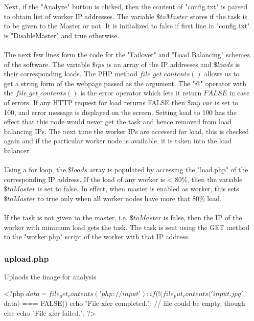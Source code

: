 \documentclass{article}
\begin{document}
Next, if the "Analyze" button is clicked, then the content of "config.txt" is parsed to obtain list of worker IP addresses. The variable $\$toMaster$ stores if the task is to be given to the Master or not. It is initialized to false if first line in "config.txt" is "DisableMaster" and true otherwise.\\ \\
The next few lines form the code for the "Failover" and "Load Balancing" schemes of the software. The variable $\$ips$ is an array of the IP addresses and $\$loads$ is their corresponding loads. The PHP method $file\_get\_contents()$ allows us to get a string form of the webpage passed as the argument. The "@" operator with the $file\_get\_contents()$ is the error operator which lets it return $FALSE$ in case of errors. If any HTTP request for load returns FALSE then $\$my\_var$ is set to 100, and error message is displayed on the screen. Setting load to 100 has the effect that this node would never get the task and hence removed from load balancing IPs. The next time the worker IPs are accessed for load, this is checked again and if the particular worker node is available, it is taken into the load balancer. \\ \\
Using a for loop, the $\$loads$ array is populated by accessing the "load.php" of the corresponding IP address. If the load of any worker is < 80\%, then the variable $\$toMaster$ is set to false. In effect, when master is enabled as worker, this sets $\$toMaster$ to true only when all worker nodes have more that 80\% load.\\ \\
If the task is not given to the master, i.e. $\$toMaster$ is false, then the IP of the worker with minimum load gets the task. The task is sent using the GET method to the "worker.php" script of the worker with that IP address.  


\subsubsection{upload.php}
Uplaods the image for analysis

\begin{php}

<?php
   $data = file_get_contents('php://input');
   if (!(file_put_contents('input.jpg',$data) === FALSE)) echo "File xfer completed.";
   // file could be empty, though
   else echo "File xfer failed.";
?>
\end{php}
\end{document}
